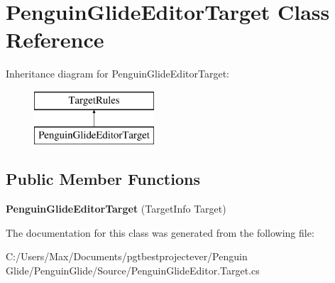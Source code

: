 \hypertarget{class_penguin_glide_editor_target}{}\section{Penguin\+Glide\+Editor\+Target Class Reference}
\label{class_penguin_glide_editor_target}
Inheritance diagram for Penguin\+Glide\+Editor\+Target\+:\begin{figure}[H]
\begin{center}
\leavevmode
\includegraphics[height=2.000000cm]{class_penguin_glide_editor_target}
\end{center}
\end{figure}
\subsection*{Public Member Functions}
\begin{DoxyCompactItemize}
\item 
\mbox{\label{class_penguin_glide_editor_target_a77f2be7f67fe73277cbb4f5de31562b4}} 
{\bfseries Penguin\+Glide\+Editor\+Target} (Target\+Info Target)
\end{DoxyCompactItemize}


The documentation for this class was generated from the following file\+:\begin{DoxyCompactItemize}
\item 
C\+:/\+Users/\+Max/\+Documents/pgtbestprojectever/\+Penguin Glide/\+Penguin\+Glide/\+Source/Penguin\+Glide\+Editor.\+Target.\+cs\end{DoxyCompactItemize}
